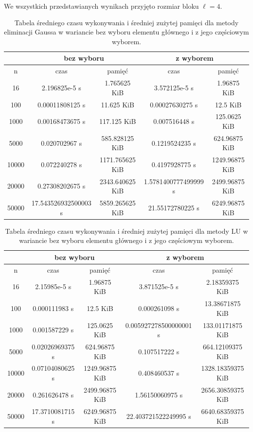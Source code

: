 \documentclass[12pt, a4paper]{article}
\begin{document}
We wszystkich przedstawianych wynikach przyjęto rozmiar bloku $\ell = 4$.

\begin{table}[!h]
        \centering
        \footnotesize
\begin{tabular}{c|c|c|c|c}
& \multicolumn{2}{c|}{bez wyboru} & \multicolumn{2}{c}{z wyborem}\\
\hline
n & czas & pamięć & czas & pamięć\\
\hline
16 & 2.196825e-5 s & 1.765625 KiB & 3.572125e-5 s & 1.96875 KiB\\
100 & 0.00011808125 s & 11.625 KiB & 0.00027630275 s & 12.5 KiB\\
1000 & 0.00168473675 s & 117.125 KiB & 0.007516448 s & 125.0625 KiB\\
5000 & 0.020702967 s & 585.828125 KiB & 0.1219524235 s & 624.96875 KiB\\
10000 & 0.072240278 s & 1171.765625 KiB & 0.4197928775 s & 1249.96875 KiB\\
20000 & 0.27308202675 s & 2343.640625 KiB & 1.5781400777499999 s & 2499.96875 KiB\\
50000 & 17.543526932500003 s & 5859.265625 KiB & 21.55172780225 s & 6249.96875 KiB
\end{tabular}
\caption{Tabela średniego czasu wykonywania i średniej zużytej pamięci dla metody eliminacji Gaussa  w wariancie bez wyboru elementu głównego i z jego częściowym wyborem.}
\end{table}

\begin{table}[!h]
        \centering
        \footnotesize
\begin{tabular}{c|c|c|c|c}
& \multicolumn{2}{c|}{bez wyboru} & \multicolumn{2}{c}{z wyborem}\\
\hline
n & czas & pamięć & czas & pamięć\\
\hline
16 & 2.15985e-5 s & 1.96875 KiB & 3.871525e-5 s & 2.18359375 KiB \\
100 & 0.000111983 s & 12.5 KiB & 0.000261098 s & 13.38671875 KiB\\
1000 & 0.001587229 s & 125.0625 KiB & 0.005927278500000001 s & 133.01171875 KiB\\
5000 & 0.02026969375 s & 624.96875 KiB & 0.107517222 s & 664.12109375 KiB\\
10000 & 0.07104080625 s & 1249.96875 KiB & 0.408460537 s & 1328.18359375 KiB\\ 
20000 & 0.261626478 s & 2499.96875 KiB & 1.56150060975 s & 2656.30859375 KiB \\
50000 & 17.3710081715 s & 6249.96875 KiB & 22.403721522249995 s & 6640.68359375 KiB 
\end{tabular}
\caption{Tabela średniego czasu wykonywania i średniej zużytej pamięci dla metody LU  w wariancie bez wyboru elementu głównego i z jego częściowym wyborem.}
\end{table}
\end{document}
